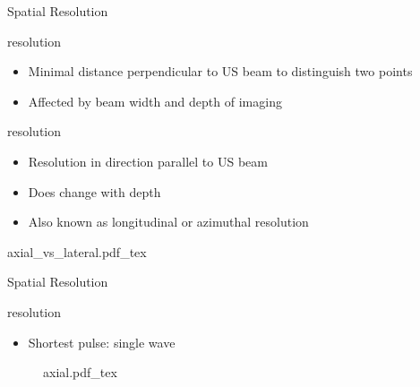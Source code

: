 %
%


\begin{frame}{Spatial Resolution}

     resolution
    \begin{itemize}
        \item Minimal distance perpendicular to US beam to distinguish two points
        \item Affected by beam width and depth of imaging
    \end{itemize}

    \vspace{.5cm}
     resolution
    \begin{itemize}
        \item Resolution in direction parallel to US beam
        \item Does  change with depth
        \item Also known as longitudinal or azimuthal resolution
    \end{itemize}

    \vspace{-1cm}
    \flushright
    \def\svgwidth{.49\linewidth}
    {axial_vs_lateral.pdf_tex}

\end{frame}


\begin{frame}{Spatial Resolution \cont}

     resolution \cont
    \begin{itemize}
        \item Shortest pulse: single wave
    \end{itemize}

    \begin{figure}
        \def\svgwidth{\linewidth}
        {axial.pdf_tex}
    \end{figure}

\end{frame}


